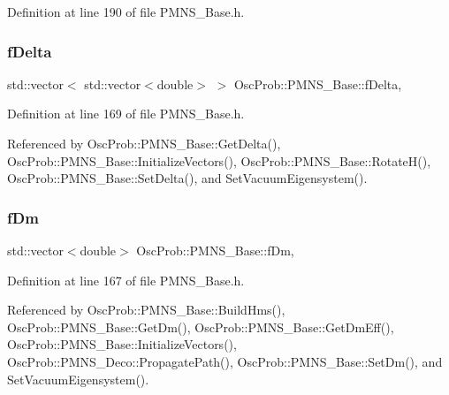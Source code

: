 Definition at line 190 of file P\+M\+N\+S\+\_\+\+Base.\+h.

\mbox{\label{classOscProb_1_1PMNS__Base_ab2a5fa40e689b221c8a7d2c17213810d}} 
\subsubsection{\texorpdfstring{f\+Delta}{fDelta}}
{\footnotesize\ttfamily std\+::vector$<$ std\+::vector$<$double$>$ $>$ Osc\+Prob\+::\+P\+M\+N\+S\+\_\+\+Base\+::f\+Delta\hspace{0.3cm}{\ttfamily [protected]}, {\ttfamily [inherited]}}



Definition at line 169 of file P\+M\+N\+S\+\_\+\+Base.\+h.



Referenced by Osc\+Prob\+::\+P\+M\+N\+S\+\_\+\+Base\+::\+Get\+Delta(), Osc\+Prob\+::\+P\+M\+N\+S\+\_\+\+Base\+::\+Initialize\+Vectors(), Osc\+Prob\+::\+P\+M\+N\+S\+\_\+\+Base\+::\+Rotate\+H(), Osc\+Prob\+::\+P\+M\+N\+S\+\_\+\+Base\+::\+Set\+Delta(), and Set\+Vacuum\+Eigensystem().

\mbox{\label{classOscProb_1_1PMNS__Base_a406a31c3b5d620e5a0cace5b411f9f70}} 
\subsubsection{\texorpdfstring{f\+Dm}{fDm}}
{\footnotesize\ttfamily std\+::vector$<$double$>$ Osc\+Prob\+::\+P\+M\+N\+S\+\_\+\+Base\+::f\+Dm\hspace{0.3cm}{\ttfamily [protected]}, {\ttfamily [inherited]}}



Definition at line 167 of file P\+M\+N\+S\+\_\+\+Base.\+h.



Referenced by Osc\+Prob\+::\+P\+M\+N\+S\+\_\+\+Base\+::\+Build\+Hms(), Osc\+Prob\+::\+P\+M\+N\+S\+\_\+\+Base\+::\+Get\+Dm(), Osc\+Prob\+::\+P\+M\+N\+S\+\_\+\+Base\+::\+Get\+Dm\+Eff(), Osc\+Prob\+::\+P\+M\+N\+S\+\_\+\+Base\+::\+Initialize\+Vectors(), Osc\+Prob\+::\+P\+M\+N\+S\+\_\+\+Deco\+::\+Propagate\+Path(), Osc\+Prob\+::\+P\+M\+N\+S\+\_\+\+Base\+::\+Set\+Dm(), and Set\+Vacuum\+Eigensystem().

